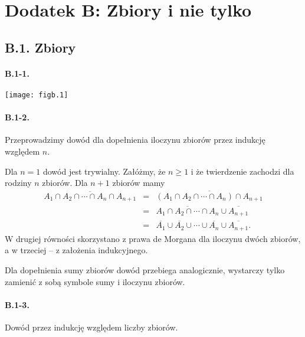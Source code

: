 \section*{Dodatek B: Zbiory i nie tylko}

\subsection*{B.1. Zbiory}

\paragraph{B.1-1.}
	\begin{center}
		\texttt{[image: figb.1]}
	\end{center}

\paragraph{B.1-2.}
Przeprowadzimy dowód dla dopełnienia iloczynu zbiorów przez indukcję względem $n$.

Dla $n=1$ dowód jest trywialny. Załóżmy, że $n\ge1$ i że twierdzenie zachodzi dla rodziny $n$ zbiorów. Dla $n+1$ zbiorów mamy
\begin{eqnarray*}
	\overline{A_1\cap A_2\cap\cdots\cap A_n\cap A_{n+1}} &=& \overline{(A_1\cap A_2\cap\cdots\cap A_n)\cap A_{n+1}} \\
	&=& \overline{A_1\cap A_2\cap\cdots\cap A_n}\cup\overline{A_{n+1}} \\
	&=& \overline{A_1}\cup\overline{A_2}\cup\cdots\cup\overline{A_n}\cup\overline{A_{n+1}}.
\end{eqnarray*}
W drugiej równości skorzystano z prawa de Morgana dla iloczynu dwóch zbiorów, a w trzeciej -- z założenia indukcyjnego.

Dla dopełnienia sumy zbiorów dowód przebiega analogicznie, wystarczy tylko zamienić z sobą symbole sumy i iloczynu zbiorów.

\paragraph{B.1-3.}
Dowód przez indukcję względem liczby zbiorów.

